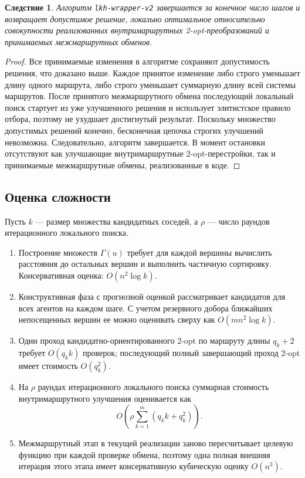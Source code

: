 \documentclass[a4paper,12pt]{article}
\newtheorem{corollary}{Следствие}[section]
\begin{document}
\begin{corollary}
Алгоритм \texttt{lkh-wrapper-v2} завершается за конечное число шагов и возвращает допустимое
решение, локально оптимальное относительно совокупности реализованных внутримаршрутных
2-opt-преобразований и принимаемых межмаршрутных обменов.
\end{corollary}

\begin{proof}
Все принимаемые изменения в алгоритме сохраняют допустимость решения, что доказано выше.
Каждое принятое изменение либо строго уменьшает длину одного маршрута, либо строго уменьшает
суммарную длину всей системы маршрутов. После принятого межмаршрутного обмена последующий
локальный поиск стартует из уже улучшенного решения и использует элитистское правило отбора,
поэтому не ухудшает достигнутый результат. Поскольку множество допустимых решений конечно,
бесконечная цепочка строгих улучшений невозможна. Следовательно, алгоритм завершается. В
момент остановки отсутствуют как улучшающие внутримаршрутные 2-opt-перестройки, так и
принимаемые межмаршрутные обмены, реализованные в коде.
\end{proof}

\subsection{Оценка сложности}

Пусть \(k\) --- размер множества кандидатных соседей, а \(\rho\) --- число раундов
итерационного локального поиска.

\begin{enumerate}[label=\arabic*.]
  \item Построение множеств \(\Gamma(u)\) требует для каждой вершины вычислить расстояния до
  остальных вершин и выполнить частичную сортировку. Консервативная оценка:
  \(O(n^2 \log k)\).
  \item Конструктивная фаза с прогнозной оценкой рассматривает кандидатов для всех агентов
  на каждом шаге.
  С учетом резервного добора ближайших непосещенных вершин ее можно оценивать сверху как
  \(O(m n^2 \log k)\).
  \item Один проход кандидатно-ориентированного 2-opt по маршруту длины \(q_k+2\) требует
  \(O(q_k k)\) проверок; последующий полный завершающий проход 2-opt имеет стоимость
  \(O(q_k^2)\).
  \item На \(\rho\) раундах итерационного локального поиска суммарная стоимость
  внутримаршрутного улучшения оценивается как
  \[
  O\!\left(\rho \sum_{k=1}^{m} (q_k k + q_k^2)\right).
  \]
  \item Межмаршрутный этап в текущей реализации заново пересчитывает целевую функцию при
  каждой проверке обмена, поэтому одна полная внешняя итерация этого этапа имеет
  консервативную кубическую оценку \(O(n^3)\).
\end{enumerate}
\end{document}

